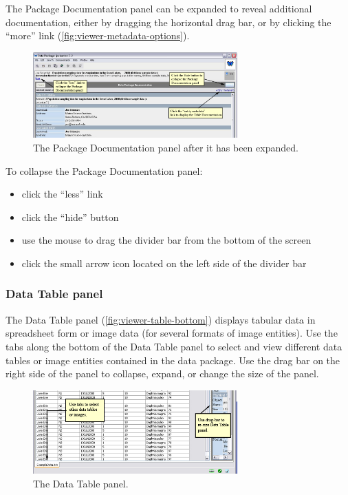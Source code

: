 The Package Documentation panel can be expanded to reveal additional
documentation, either by dragging the horizontal drag bar, or by
clicking the ``more'' link (\autoref{fig:viewer-metadata-options}).

\begin{figure}
  \centering
    \includegraphics[width=0.7\textwidth]{images/viewer-metadata-options.jpg}
  \caption{The Package Documentation panel after it has been expanded.}
  \label{fig:viewer-metadata-options}
\end{figure}


To collapse the Package Documentation panel:
\begin{itemize}
  \setlength{\parskip}{1pt}
  \item click the ``less'' link 
  \item click the ``hide'' button 
  \item use the mouse to drag the divider bar from the bottom of the
    screen
  \item click the small arrow icon located on the left side of the
    divider bar 
\end{itemize}

\subsubsection{Data Table panel} \label{sec:panel-table}

The Data Table panel (\autoref{fig:viewer-table-bottom}) displays
tabular data in spreadsheet form or image data (for several formats of
image entities). Use the tabs along the bottom of the Data Table panel
to select and view different data tables or image entities contained in
the data package. Use the drag bar on the right side of the panel to
collapse, expand, or change the size of the panel.

\begin{figure}
  \centering
    \includegraphics[width=0.7\textwidth]{images/viewer-table-bottom.jpg}
  \caption{The Data Table panel.}
  \label{fig:viewer-table-bottom}
\end{figure}

